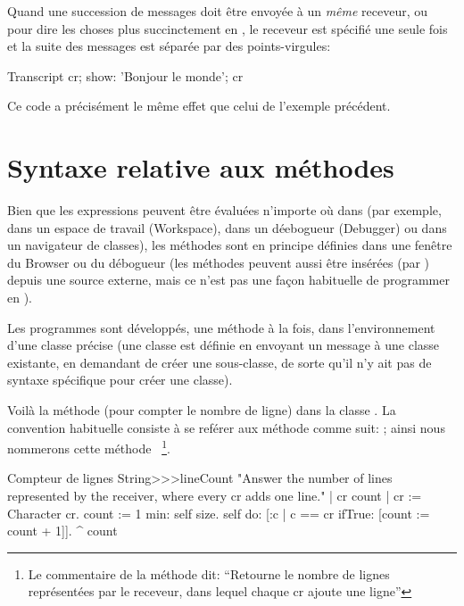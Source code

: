 \documentclass[a4paper,10pt,twoside]{book}
\begin{document}
Quand une succession de messages doit \^{e}tre envoy\'{e}e \`{a} un \emph{m\^{e}me} receveur, 
ou pour dire les choses plus succinctement en , le receveur est sp\'{e}cifi\'{e} une seule fois et la suite des messages est s\'{e}par\'{e}e par des points-virgules:

\begin{code}{}
Transcript cr;
    show: 'Bonjour le monde';
    cr
\end{code}
Ce code a pr\'{e}cis\'{e}ment le m\^{e}me effet que celui de l'exemple pr\'{e}c\'{e}dent.


\section{Syntaxe relative aux m\'{e}thodes}
Bien que les expressions peuvent \^{e}tre \'{e}valu\'{e}es n'importe
o\`{u} dans \sq (par exemple, dans un espace de travail (Workspace),
dans un d\'{e}ebogueur (Debugger) ou dans un navigateur de classes), 
les m\'{e}thodes sont en principe d\'{e}finies dans une fen\^{e}tre du Browser ou du d\'{e}bogueur
(les m\'{e}thodes peuvent aussi \^{e}tre insérées (par )
depuis une source externe, mais ce n'est pas une fa\c{c}on habituelle de programmer en \sq).

Les programmes sont d\'{e}velopp\'{e}s, une m\'{e}thode \`{a} la fois,
dans l'environnement d'une classe pr\'{e}cise (une classe est d\'{e}finie en envoyant un message \`{a} une classe existante, en demandant de cr\'{e}er une sous-classe, de sorte qu'il n'y ait pas de syntaxe sp\'{e}cifique pour cr\'{e}er une classe).

Voil\`{a} la m\'{e}thode  (pour compter le
nombre de ligne) dans la classe  .
La convention habituelle consiste à se ref\'{e}rer aux m\'{e}thode
comme suit: ; ainsi nous nommerons cette
m\'{e}thode ~\footnote{Le commentaire de la
  m\'ethode dit: 
``Retourne le nombre de lignes représentées par le receveur, dans
    lequel chaque cr ajoute une ligne''}.

\begin{method}[lineCount]{Compteur de lignes}
String>>>lineCount
   "Answer the number of lines represented by the receiver,
   where every cr adds one line."
   | cr count |
   cr := Character cr.
   count := 1  min: self size.
   self do:
      [:c | c == cr ifTrue: [count := count + 1]].
   ^ count
\end{method}
\end{document}
